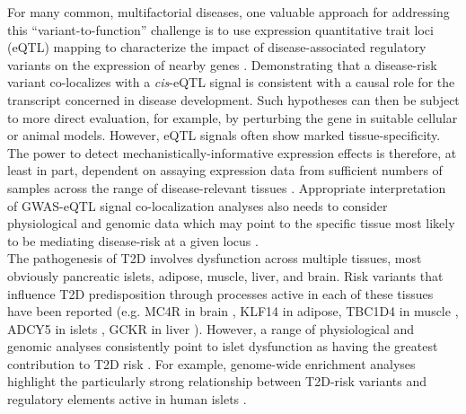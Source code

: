 For many common, multifactorial diseases, one valuable approach for addressing this “variant-to-function” challenge is to use expression quantitative trait loci (eQTL) mapping to characterize the impact of disease-associated regulatory variants on the expression of nearby genes \cite{gamazonUsingAtlasGene2018}. Demonstrating that a disease-risk variant co-localizes with a \textit{cis}-eQTL signal is consistent with a causal role for the transcript concerned in disease development. Such hypotheses can then be subject to more direct evaluation, for example, by perturbing the gene in suitable cellular or animal models. However, eQTL signals often show marked tissue-specificity. The power to detect mechanistically-informative expression effects is therefore, at least in part, dependent on assaying expression data from sufficient numbers of samples across the range of disease-relevant tissues \cite{gamazonUsingAtlasGene2018}. Appropriate interpretation of GWAS-eQTL signal co-localization analyses also needs to consider physiological and genomic data which may point to the specific tissue most likely to be mediating disease-risk at a given locus \cite{mahajanFinemappingTypeDiabetes2018, mahajanRefiningAccuracyValidated2018}. \\
    
The pathogenesis of T2D involves dysfunction across multiple tissues, most obviously pancreatic islets, adipose, muscle, liver, and brain. Risk variants that influence T2D predisposition through processes active in each of these tissues have been reported (e.g. MC4R in brain \cite{vaisseMelanocortin4ReceptorMutations2000}, KLF14 in adipose, TBC1D4 in muscle \cite{moltkeCommonGreenlandicTBC1D42014}, ADCY5 in islets \cite{thurnerIntegrationHumanPancreatic2018}, GCKR in liver \cite{saxenaGenomeWideAssociationAnalysis2007}). However, a range of physiological and genomic analyses consistently point to islet dysfunction as having the greatest contribution to T2D risk \cite{mahajanFinemappingTypeDiabetes2018, dimasImpactTypeDiabetes2014, woodGenomeWideAssociationStudy2017}. For example, genome-wide enrichment analyses highlight the particularly strong relationship between T2D-risk variants and regulatory elements active in human islets \cite{parkerChromatinStretchEnhancer2013, pasqualiPancreaticIsletEnhancer2014, varshneyGeneticRegulatorySignatures2017, thurnerIntegrationHumanPancreatic2018}. \\
    
